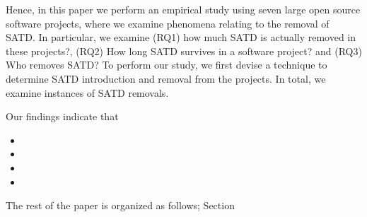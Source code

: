 Hence, in this paper we perform an empirical study using seven large open source software projects, where we examine phenomena relating to the removal of SATD. In particular, we examine (RQ1) how much SATD is actually removed in these projects?, (RQ2) How long SATD survives in a software project? and (RQ3) Who removes SATD? To perform our study, we first devise a technique to determine SATD introduction and removal from the projects. In total, we examine  instances of SATD removals.

Our findings indicate that 
\begin{itemize}
	\item 
	\item 
	\item
	\item
\end{itemize}

The rest of the paper is organized as follows; Section 